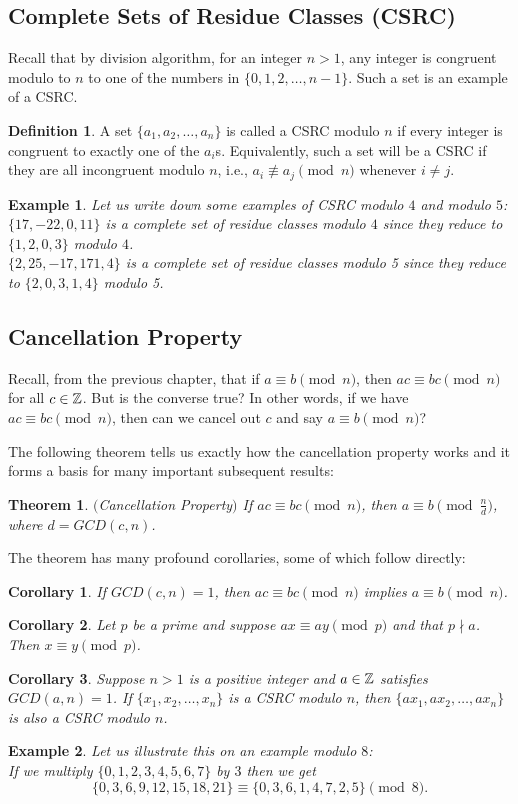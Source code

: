 \documentclass[12pt]{article}
\theoremstyle{plain}
\newtheorem{corollary}{Corollary}
\newtheorem{example}{Example}
\newtheorem{theorem}{Theorem}
\theoremstyle{definition}
\newtheorem{definition}{Definition}
\theoremstyle{remark}
\begin{document}
\subsection{Complete Sets of Residue Classes (CSRC)}
Recall that by division algorithm, for an integer $n>1$, any integer is congruent modulo to $n$ to one of the numbers in $\{0,1,2, \dots, n-1\}$. Such a set is an example of a CSRC. 
\begin{definition}
A set $\{a_1, a_2, \dots, a_n\}$ is called a CSRC modulo $n$ if every integer is congruent to exactly one of the $a_i$s. Equivalently, such a set will be a CSRC if they are all incongruent modulo $n$, i.e., $a_i\not \equiv a_j \pmod{n}$ whenever $i\neq j$. 
\end{definition}
\begin{example}
Let us write down some examples of CSRC modulo $4$ and modulo $5$:
\\
$\{17,-22, 0, 11\} $ is a complete set of residue classes modulo $4$ since they reduce to $\{1,2,0,3\}$ modulo $4$.
\\
$\{2, 25, -17, 171, 4\} $ is a complete set of residue classes modulo 5 since they reduce to $\{2,0,3,1,4\}$ modulo 5.
\end{example}

\subsection{Cancellation Property}
Recall, from the previous chapter, that if $a\equiv b \pmod{n}$, then $ac\equiv bc \pmod{n}$ for all $c\in \mathbb{Z}$. But is the converse true? In other words, if we have $ac\equiv bc \pmod{n}$, then can we cancel out $c$ and say $a\equiv b \pmod{n}$?

\bigskip
\noindent
The following theorem tells us exactly how the cancellation property works and it forms a basis for many important subsequent results:
\begin{theorem} $($Cancellation Property$)$
If $ac\equiv bc \pmod{n}$, then $a\equiv b \pmod{\frac{n}{d}}$, where $d=GCD(c,n)$. 
\end{theorem}

\bigskip
\noindent
The theorem has many profound corollaries, some of which follow directly:
\begin{corollary}
If $GCD(c,n)=1$, then $ac\equiv bc \pmod{n}$ implies $a\equiv b \pmod{n}$.
\end{corollary}
\begin{corollary}
Let $p$ be a prime and suppose $ax\equiv ay \pmod{p}$ and that $p\nmid a$. Then $x\equiv y \pmod{p}$.
\end{corollary}
\begin{corollary}\label{CSRC}
Suppose $n>1$ is a positive integer and $a\in \mathbb{Z}$ satisfies $GCD(a,n)=1$. If $\{x_1, x_2, \dots, x_n\}$ is a CSRC modulo $n$, then $\{ax_1, ax_2, \dots, ax_n\}$ is also a CSRC modulo $n$.  
\end{corollary}
\begin{example}
Let us illustrate this on an example modulo $8$:
\\
If we multiply $\{0,1,2,3,4,5,6,7\}$ by $3$ then we get 
$$\{0,3,6,9,12,15,18,21\} \equiv \{0,3,6,1,4,7,2,5\} \pmod{8}.$$
\end{example}
\end{document}
